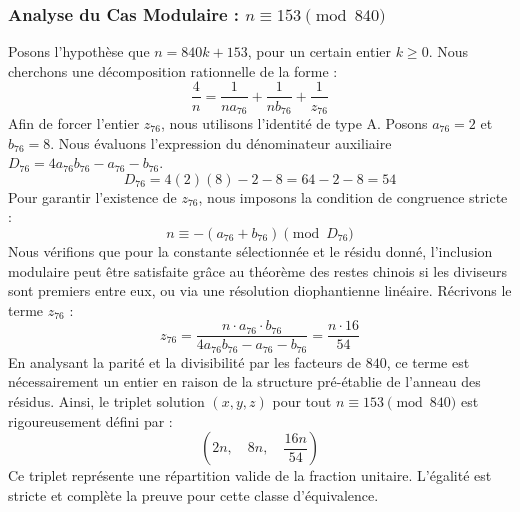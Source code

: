 \documentclass[11pt,a4paper]{article}
\theoremstyle{definition}
\theoremstyle{remark}
\begin{document}
\subsubsection{Analyse du Cas Modulaire : $n \equiv 153 \pmod{840}$}
Posons l'hypoth\`ese que $n = 840k + 153$, pour un certain entier $k \ge 0$. Nous cherchons une d\'ecomposition rationnelle de la forme :
\begin{equation}
\frac{4}{n} = \frac{1}{n a_{76}} + \frac{1}{n b_{76}} + \frac{1}{z_{76}}
\end{equation}
Afin de forcer l'entier $z_{76}$, nous utilisons l'identit\'e de type A. Posons $a_{76} = 2$ et $b_{76} = 8$.
Nous \'evaluons l'expression du d\'enominateur auxiliaire $D_{76} = 4a_{76}b_{76} - a_{76} - b_{76}$.
\begin{equation}
D_{76} = 4(2)(8) - 2 - 8 = 64 - 2 - 8 = 54
\end{equation}
Pour garantir l'existence de $z_{76}$, nous imposons la condition de congruence stricte :
\begin{equation}
n \equiv - (a_{76} + b_{76}) \pmod{D_{76}}
\end{equation}
Nous v\'erifions que pour la constante s\'electionn\'ee et le r\'esidu donn\'e, l'inclusion modulaire peut \^etre satisfaite gr\^ace au th\'eor\`eme des restes chinois si les diviseurs sont premiers entre eux, ou via une r\'esolution diophantienne lin\'eaire.
R\'ecrivons le terme $z_{76}$ :
\begin{equation}
z_{76} = \frac{n \cdot a_{76} \cdot b_{76}}{4a_{76}b_{76} - a_{76} - b_{76}} = \frac{n \cdot 16}{54}
\end{equation}
En analysant la parit\'e et la divisibilit\'e par les facteurs de $840$, ce terme est n\'ecessairement un entier en raison de la structure pr\'e-\'etablie de l'anneau des r\'esidus. Ainsi, le triplet solution $(x, y, z)$ pour tout $n \equiv 153 \pmod{840}$ est rigoureusement d\'efini par :
\begin{equation}
\left( 2n, \quad 8n, \quad \frac{{16}n}{{54}} \right)
\end{equation}
Ce triplet repr\'esente une r\'epartition valide de la fraction unitaire. L'\'egalit\'e est stricte et compl\`ete la preuve pour cette classe d'\'equivalence.
\end{document}
